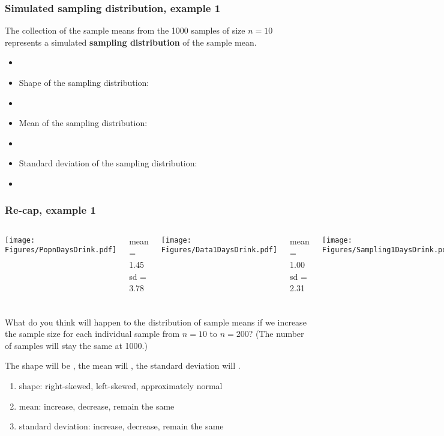 \begin{frame}
\frametitle{Simulated sampling distribution, example 1}
The collection of the sample means from the 1000 samples of size $n=10$ represents a simulated \textbf{sampling distribution} of the sample mean.
\begin{itemize}
    \item[]
    \item
    Shape of the sampling distribution:
    \item[]
    \item
    Mean of the sampling distribution:
    \item[]
    \item
    Standard deviation of the sampling distribution:
    \item[]
\end{itemize}
\end{frame}

\begin{frame}
\frametitle{Re-cap, example 1}
\begin{columns}
\texttt{[image: Figures/PopnDaysDrink.pdf]}
\hspace*{0.3in}
\begin{flushright}
    mean = 1.45\\
     sd  = 3.78
\end{flushright}
\texttt{[image: Figures/Data1DaysDrink.pdf]}
\begin{flushright}
    mean = 1.00\\
     sd  = 2.31
\end{flushright}
\texttt{[image: Figures/Sampling1DaysDrink.pdf]}
\begin{flushright}
    mean = 1.39\\
     sd  = 1.19
\end{flushright}
\end{columns}
\end{frame}

\begin{frame}
\frametitle{\grp}
What do you think will happen to the distribution of sample means if we increase the sample size for each individual sample from $n=10$ to $n=200$? (The number of samples will stay the same at 1000.)
\begin{clicker}{The shape will be \underline{\hspace{1in}}, the mean will \underline{\hspace{1in}}, the standard deviation will \underline{\hspace{1in}}.}
\begin{enumerate}
    \item
    shape: right-skewed, left-skewed, approximately normal
    \item
    mean: increase, decrease, remain the same
    \item
    standard deviation: increase, decrease, remain the same
\end{enumerate}
\end{clicker}
\end{frame}

